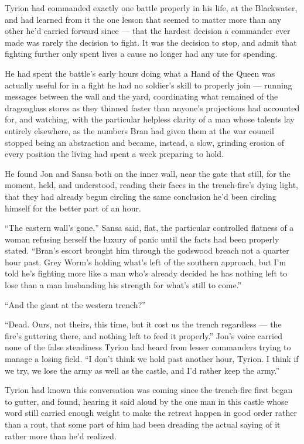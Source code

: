 Tyrion had commanded exactly one battle properly in his life, at the Blackwater, and had learned from it the one lesson that seemed to matter more than any other he’d carried forward since — that the hardest decision a commander ever made was rarely the decision to fight. It was the decision to stop, and admit that fighting further only spent lives a cause no longer had any use for spending.

He had spent the battle’s early hours doing what a Hand of the Queen was actually useful for in a fight he had no soldier’s skill to properly join — running messages between the wall and the yard, coordinating what remained of the dragonglass stores as they thinned faster than anyone’s projections had accounted for, and watching, with the particular helpless clarity of a man whose talents lay entirely elsewhere, as the numbers Bran had given them at the war council stopped being an abstraction and became, instead, a slow, grinding erosion of every position the living had spent a week preparing to hold.

He found Jon and Sansa both on the inner wall, near the gate that still, for the moment, held, and understood, reading their faces in the trench-fire’s dying light, that they had already begun circling the same conclusion he’d been circling himself for the better part of an hour.

“The eastern wall’s gone,” Sansa said, flat, the particular controlled flatness of a woman refusing herself the luxury of panic until the facts had been properly stated. “Bran’s escort brought him through the godswood breach not a quarter hour past. Grey Worm’s holding what’s left of the southern approach, but I’m told he’s fighting more like a man who’s already decided he has nothing left to lose than a man husbanding his strength for what’s still to come.”

“And the giant at the western trench?”

“Dead. Ours, not theirs, this time, but it cost us the trench regardless — the fire’s guttering there, and nothing left to feed it properly.” Jon’s voice carried none of the false steadiness Tyrion had heard from lesser commanders trying to manage a losing field. “I don’t think we hold past another hour, Tyrion. I think if we try, we lose the army as well as the castle, and I’d rather keep the army.”

Tyrion had known this conversation was coming since the trench-fire first began to gutter, and found, hearing it said aloud by the one man in this castle whose word still carried enough weight to make the retreat happen in good order rather than a rout, that some part of him had been dreading the actual saying of it rather more than he’d realized.

